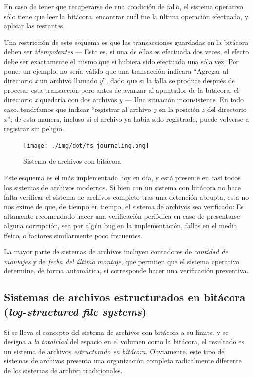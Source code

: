 \documentclass[11pt,fleqn]{book} %
\begin{document}
En caso de tener que recuperarse de una condición de fallo, el
sistema operativo sólo tiene que leer la bitácora, encontrar cuál fue
la última operación efectuada, y aplicar las restantes.

Una restricción de este esquema es que las transacciones guardadas en
la bitácora deben ser \emph{idempotentes} — Esto es, si una de ellas es
efectuada dos veces, el efecto debe ser exactamente el mismo que si
hubiera sido efectuada una sóla vez. Por poner un ejemplo, no sería
válido que una transacción indicara ``Agregar al directorio \emph{x} un
archivo llamado \emph{y}'', dado que si la falla se produce después de
procesar esta transacción pero antes de avanzar al apuntador de la
bitácora, el directorio \emph{x} quedaría con dos archivos \emph{y} — Una
situación inconsistente. En todo caso, tendríamos que indicar
``registrar al archivo \emph{y} en la posición \emph{z} del directorio \emph{x}''; de
esta manera, incluso si el archivo ya había sido registrado, puede
volverse a registrar sin peligro.

\begin{figure}[htb]
\centering
\texttt{[image: ./img/dot/fs\_journaling.png]}
\caption{\label{FS_fs_journaling}Sistema de archivos con bitácora}
\end{figure}

Este esquema es el más implementado hoy en día, y está presente en
casi todos los sistemas de archivos modernos. Si bien con un sistema
con bitácora no hace falta verificar el sistema de archivos completo
tras una detención abrupta, esta no nos exime de que, de tiempo en
tiempo, el sistema de archivos sea verificado: Es altamente
recomendado hacer una verificación periódica en caso de presentarse
alguna corrupción, sea por algún bug en la implementación, fallos en
el medio físico, o factores similarmente poco frecuentes.

La mayor parte de sistemas de archivos incluyen contadores de
\emph{cantidad de montajes} y de \emph{fecha del último montaje}, que permiten
que el sistema operativo determine, de forma automática, si
corresponde hacer una verificación preventiva.
\subsection{Sistemas de archivos estructurados en bitácora (\emph{log-structured file systems})}
\label{sec-7-3-5}
\label{FS_log_structured}

Si se lleva el concepto del sistema de archivos con bitácora a su
límite, y se designa a \emph{la totalidad} del espacio en el volumen como
la bitácora, el resultado es un sistema de archivos \emph{estructurado en bitácora}. Obviamente, este tipo de sistemas de archivos presenta una
organización completa radicalmente diferente de los sistemas de
archivo tradicionales.
\end{document}
